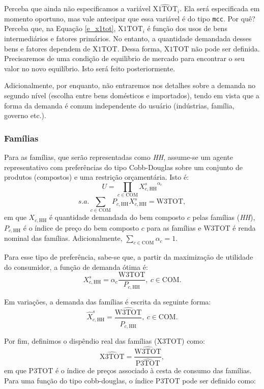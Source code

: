 \documentclass[12pt,twoside]{article}
\begin{document}
Perceba que ainda não especificamos a variável \(\hat{\text{X1TOT}}_i\).
Ela será especificada em momento oportuno, mas vale antecipar que essa
variável é do tipo \texttt{mcc}. Por quê? Perceba que, na Equação
\ref{e_x1tot}, \(\text{X1TOT}_i\) é função dos usos de bens
intermediários e fatores primários. No entanto, a quantidade demandada
desses bens e fatores dependem de \(\text{X1TOT}\). Dessa forma,
\(\text{X1TOT}\) não pode ser definida. Precisaremos de uma condição de
equilibrio de mercado para encontrar o seu valor no novo equilíbrio.
Isto será feito posteriormente.

Adicionalmente, por enquanto, não entraremos nos detalhes sobre a
demanda no segundo nível (escolha entre bens domésticos e importados),
tendo em vista que a forma da demanda é comum independente do usuário
(indústrias, família, governo etc.).

\hypertarget{famuxedlias}{%
\subsubsection{Famílias}\label{famuxedlias}}

Para as famílias, que serão representadas como \emph{HH}, assume-se um
agente representativo com preferências do tipo Cobb-Douglas sobre um
conjunto de produtos (compostos) e uma restrição orçamentária. Isto é:
\[U = \prod_{c \in \text{COM}}{X^s_{c,\text{HH}}}^{\alpha_c}\]
\[s.a. \sum_{c\in \text{COM}} P_{c,\text{HH}} X^s_{c,\text{HH}} = \text{W3TOT},\]
em que \(X_{c,\text{HH}}\) é quantidade demandada do bem composto \(c\)
pelas famílias (\emph{HH}), \(P_{c,\text{HH}}\) é o índice de preço do
bem composto \(c\) para as famílias e \(\text{W3TOT}\) é renda nominal
das famílias. Adicionalmente, \(\sum_{c \in \text{COM}} \alpha_c = 1\).

Para esse tipo de preferência, sabe-se que, a partir da maximização de
utilidade do consumidor, a função de demanda ótima é:
\[X^s_{c,\text{HH}} = \alpha_c \frac{\text{W3TOT}}{P_{c,\text{HH}}},~ c \in \text{COM}.\]

Em variações, a demanda das famílias é escrita da seguinte forma:
\[\hat{X}^s_{c,\text{HH}} =  \frac{\hat{\text{W3TOT}}}{\hat{P}_{c,\text{HH}}}, ~ c \in \text{COM}.\]

Por fim, definimos o dispêndio real das famílias (\(\text{X3TOT}\))
como:
\[\hat{\text{X3TOT}} = \frac{\hat{\text{W3TOT}}}{\hat{\text{P3TOT}}},\]
em que \(\text{P3TOT}\) é o índice de preços associado à cesta de
consumo das famílias. Para uma função do tipo cobb-douglas, o índice
\(\text{P3TOT}\) pode ser definido como:
\end{document}
